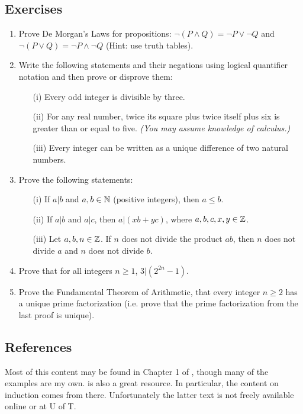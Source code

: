 \documentclass{article}
\begin{document}
\subsection{Exercises}
\begin{enumerate}
\item Prove De Morgan's Laws for propositions: $\neg (P \wedge Q) = \neg P \vee \neg Q$ and $\neg (P \vee Q) = \neg P \wedge \neg Q$ (Hint: use truth tables).
\item Write the following statements and their negations using logical quantifier notation and then prove or disprove them:
\begin{enumerate}
    \item[(i)] Every odd integer is divisible by three.
    \item [(ii)] For any real number, twice its square plus twice itself plus six is greater than or equal to five. \textit{(You may assume knowledge of calculus.)}
    \item[(iii)] Every integer can be written as a unique difference  of two natural numbers.
\end{enumerate}
\item Prove the following statements:
\begin{enumerate}
    \item[(i)] If $a | b$ and $a,b \in {\mathbb{N}}$ (positive integers), then $a \leq b$.    \item[(ii)] If $a | b$ and $a | c$, then $a | (x b + y c)$, where $a,b,c,x,y \in {\mathbb{Z}}$.
    \item[(iii)] Let $a,b,n \in {\mathbb{Z}}$. If $n$ does not divide the product $ab$, then $n$ does not divide $a$ and $n$ does not divide $b$.
\end{enumerate}
\item Prove that for all integers $n \geq 1$, $3|(2^{2n}-1)$.
\item Prove the Fundamental Theorem of Arithmetic, that every integer $n \geq 2$ has a unique prime factorization (i.e. prove that the prime factorization from the last proof is unique).
\end{enumerate}


\subsection{References}
Most of this content may be found in Chapter 1 of \cite{proofs}, though many of the examples are my own. \cite{toolsreasoning} is also a great resource. In particular, the content on induction comes from there. Unfortunately the latter text is not freely available online or at U of T. 
\end{document}
